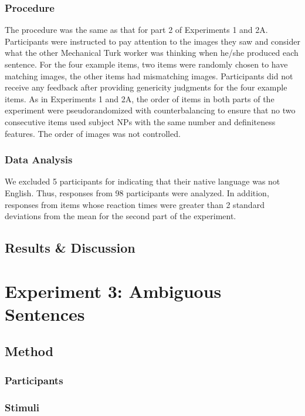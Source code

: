 \documentclass[10pt,letterpaper]{article}
\begin{document}
\subsubsection{Procedure} \quad The procedure was the same as that for part 2 of Experiments 1 and 2A. Participants were instructed to pay attention to the images they saw and consider what the other Mechanical Turk worker was thinking when he/she produced each sentence. For the four example items, two items were randomly chosen to have matching images, the other items had mismatching images. Participants did not receive any feedback after providing genericity judgments for the four example items. As in Experiments 1 and 2A, the order of items in both parts of the experiment were pseudorandomized with counterbalancing to ensure that no two consecutive items used subject NPs with the same number and definiteness features. The order of images was not controlled.

\subsubsection{Data Analysis} \quad We excluded 5 participants for indicating that their native language was not English. Thus, responses from 98 participants were analyzed. In addition, responses from items whose reaction times were greater than 2 standard deviations from the mean for the second part of the experiment.

\subsection{Results \& Discussion}

\section{Experiment 3: Ambiguous Sentences}

\subsection{Method} 

\subsubsection{Participants} \quad

\subsubsection{Stimuli} \quad
\end{document}
